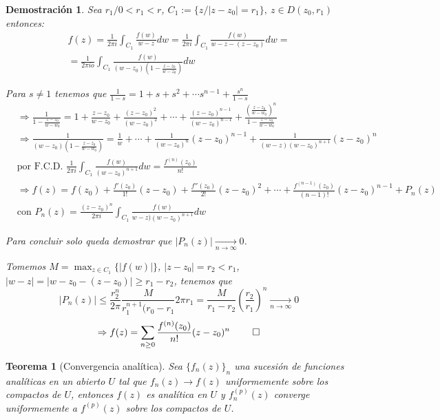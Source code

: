 \documentclass[12pt]{book}
\newtheorem{theorem}{Teorema}[chapter]
\newtheorem*{dem}{Demostración}
\begin{document}
\begin{dem}
Sea $r_1 /  0<r_1<r$, $C_1 := \{z/|z-z_0|=r_1\},\ z\in D(z_0,r_1)$ entonces:
\begin{multline*}
f(z) = \frac{1}{2\pi i} \int_{C_1}\frac{f(w)}{w-z}dw = \frac{1}{2\pi i}\int_{C_1} \frac{f(w)}{w-z-(z-z_0)}dw =\\
= \frac{1}{2\pi io} \int_{C_1} \frac{f(w)}{(w-z_0)\left(1-\frac{z-z_0}{w-z_0}\right)}dw
\end{multline*}

Para $s\neq 1$ tenemos que $\frac{1}{1-s} = 1 +s+s^2+\cdots s^{n-1} +\frac{s^n}{1-s}$
\begin{align*}
&\Rightarrow \frac{1}{1-\frac{z-z_0}{w-w_0}} = 1 + \frac{z-z_0}{w-z_0} +\frac{(z-z_0)^2}{(w-z_0)^2} +\cdots + \frac{(z-z_0)^{n-1}}{(w-z_0)^{n-1}} + \frac{\left(\frac{z-z_0}{w-w_0}\right)^n}{1-\frac{z-z_0}{w-w_0}}\\
&\Rightarrow \frac{1}{(w-z_0)\left(1-\frac{z-z_0}{w-w_0}\right)} = \frac{1}{w} +  \cdots + \frac{1}{(w-z_0)^n}(z-z_0)^{n-1} + \frac{1}{(w-z)(w-z_0)^{n+1}}(z-z_0)^n\\
&\text{por F.C.D. } \frac{1}{2\pi i} \int_{C_1}\frac{f(w)}{(w-z_0)^{n+1}}dw = \frac{f^{(n)}(z_0)}{n!}\\
& \Rightarrow f(z) = f(z_0) + \frac{f'(z_0)}{1!}(z-z_0) +\frac{f''(z_0)}{2!}(z-z_0)^2+ \cdots + \frac{f^{(n-1)}(z_0)}{(n-1)!}(z-z_0)^{n-1} + P_n(z)\\
& \text{con } P_n(z) = \frac{(z-z_0)^n}{2\pi i}\int_{C_1} \frac{f(w)}{w-z)(w-z_0)^{n+1}}dw
\end{align*}

Para concluir solo queda demostrar que $|P_n(z)| \xrightarrow[n\to \infty]{}0$.

Tomemos $M = \max_{z\in C_1}\{|f(w)|\}$, $|z-z_0| = r_2 < r_1$, $|w-z| = |w-z_0-(z-z_0)| \geq r_1-r_2$, tenemos que
$$|P_n(z)| \leq \frac{r_2^n}{2\pi}\frac{M}{r_1^{n+1}(r_0-r_1}2\pi r_1 = \frac{M}{r_1-r_2}\left(\frac{r_2}{r_1}\right)^n \xrightarrow[n\to \infty]{}0$$
$$\Rightarrow f(z) = \sum_{n\geq 0} \frac{f^{(n)}(z_0)}{n!}(z-z_0)^n\ \qed$$ 
\end{dem}


\begin{theorem}[Convergencia analítica]
Sea $\{f_n(z)\}_n$ una sucesión de funciones analíticas en un abierto $U$ tal que $f_n(z) \to f(z)$ uniformemente sobre los compactos  de $U$, entonces $f(z)$ es analítica en $U$ y $f_n^{(p)}(z)$ converge uniformemente a $f^{(p)}(z)$ sobre los compactos de $U$.
\end{theorem}
\end{document}
